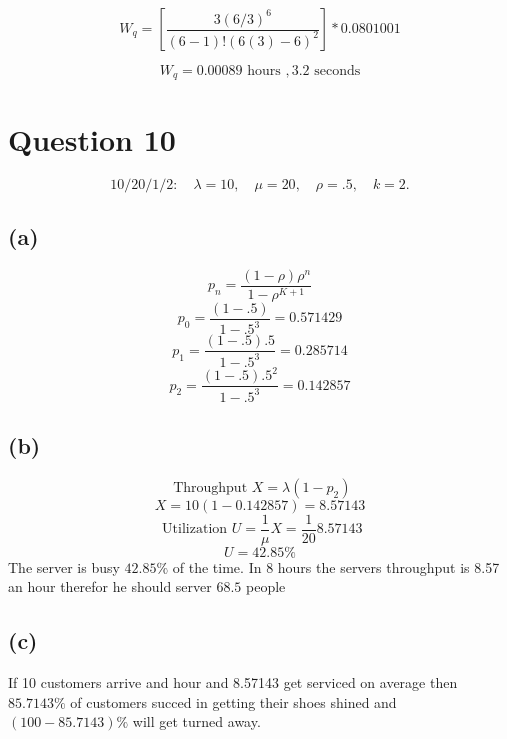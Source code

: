 \documentclass{article}
\begin{document}
\[W_q = \left[\frac{3(6/3)^6}{(6 - 1)!(6(3) - 6)^2}\right] * 0.0801001\]

\[ W_q = 0.00089 \mbox{ hours } , \boxed{3.2 \mbox{ seconds}}\]
 \section*{Question 10}
 \[10/20/1/2 : \quad \lambda = 10, \quad \mu = 20, \quad \rho = .5 , \quad k =
 2.\] 
 \subsection*{(a)}
 \[p_n = \frac{(1-\rho)\rho^n}{1-\rho^{K+1}}\]
 \[p_0 = \frac{(1-.5)}{1-.5^3} = \boxed{0.571429}\]
 \[p_1 = \frac{(1-.5).5}{1-.5^3} = \boxed{0.285714}\]
 \[p_2 = \frac{(1-.5).5^2}{1-.5^3} = \boxed{0.142857}
 \]
 \subsection*{(b)}
 \[ \mbox{ Throughput }X = \lambda ( 1 - p_2) \]
 \[ X = 10(1 - 0.142857) = 8.57143 \] 
 \[\mbox{ Utilization } U = \frac{1}{\mu}X  = \frac{1}{20}8.57143 \]
 \[ U = 42.85\% \] 
 The server is busy $\boxed{42.85\%}$ of the time. 
 In 8 hours the servers throughput is 8.57 an hour therefor he should server
 $\boxed{68.5}$ people
  \subsection*{(c)}
  If 10 customers arrive and hour and 8.57143 get serviced on average then
  $\boxed{85.7143\%}$ of customers succed in getting their shoes shined and
  $(100 - 85.7143)\%$ will get turned away. 
  
\end{document}
